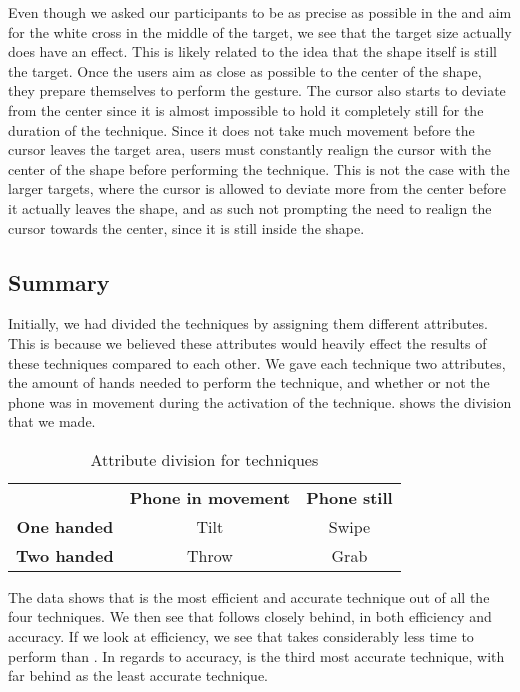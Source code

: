 Even though we asked our participants to be as precise as possible in the \accuracy and aim for the white cross in the middle of the target, we see that the target size actually does have an effect.
This is likely related to the idea that the shape itself is still the target. 
Once the users aim as close as possible to the center of the shape, they prepare themselves to perform the gesture. 
The cursor also starts to deviate from the center since it is almost impossible to hold it completely still for the duration of the technique.
Since it does not take much movement before the cursor leaves the target area, users must constantly realign the cursor with the center of the shape before performing the technique.
This is not the case with the larger targets, where the cursor is allowed to deviate more from the center before it actually leaves the shape, and as such not prompting the need to realign the cursor towards the center, since it is still inside the shape. 

\subsection{Summary}
Initially, we had divided the techniques by assigning them different attributes. 
This is because we believed these attributes would heavily effect the results of these techniques compared to each other.
We gave each technique two attributes, the amount of hands needed to perform the technique, and whether or not the phone was in movement during the activation of the technique.
 shows the division that we made.

\begin{table}[H]
	\centering
	
	\def\arraystretch{1.5}
	\begin{tabular}{c c c}
		& \textbf{Phone in movement} & \textbf{Phone still} \\ \cline{1-3}
		\textbf{One handed} & Tilt & Swipe \\ \cline{1-3}
		\textbf{Two handed} & Throw & Grab \\ \cline{1-3}
	\end{tabular}
	\caption{Attribute division for techniques}
	\label{tab:division}
\end{table}

The data shows that \swipe is the most efficient and accurate technique out of all the four techniques.
We then see that \throw follows closely behind, in both efficiency and accuracy. 
If we look at efficiency, we see that \tilt takes considerably less time to perform than \grab.
In regards to accuracy, \grab is the third most accurate technique, with \tilt far behind as the least accurate technique.

